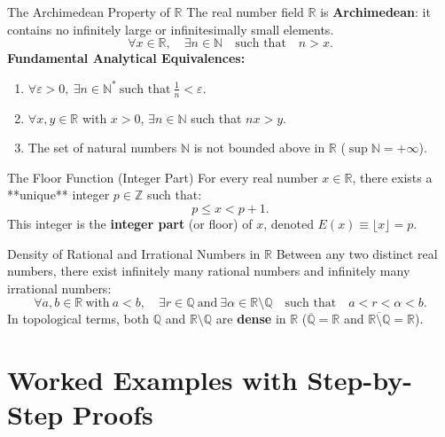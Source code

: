 \begin{theorembox}{The Archimedean Property of $\mathbb{R}$}
The real number field $\mathbb{R}$ is \textbf{Archimedean}: it contains no infinitely large or infinitesimally small elements.
\begin{equation}
\forall x \in \mathbb{R}, \quad \exists n \in \mathbb{N} \quad \text{such that} \quad n > x.
\end{equation}
\textbf{Fundamental Analytical Equivalences:}
\begin{enumerate}[leftmargin=1.4em,itemsep=2pt]
  \item $\forall \varepsilon > 0, \ \exists n \in \mathbb{N}^* \ \text{such that} \ \frac{1}{n} < \varepsilon$.
  \item $\forall x, y \in \mathbb{R}$ with $x > 0$, $\exists n \in \mathbb{N}$ such that $n x > y$.
  \item The set of natural numbers $\mathbb{N}$ is not bounded above in $\mathbb{R}$ ($\sup \mathbb{N} = +\infty$).
\end{enumerate}
\end{theorembox}

\begin{propbox}{The Floor Function (Integer Part)}
For every real number $x \in \mathbb{R}$, there exists a **unique** integer $p \in \mathbb{Z}$ such that:
\begin{equation}
p \le x < p + 1.
\end{equation}
This integer is the \textbf{integer part} (or floor) of $x$, denoted $E(x) \equiv \lfloor x \rfloor = p$.
\end{propbox}

\begin{theorembox}{Density of Rational and Irrational Numbers in $\mathbb{R}$}
Between any two distinct real numbers, there exist infinitely many rational numbers and infinitely many irrational numbers:
\begin{equation}
\forall a, b \in \mathbb{R} \ \text{with} \ a < b, \quad \exists r \in \mathbb{Q} \ \text{and} \ \exists \alpha \in \mathbb{R} \setminus \mathbb{Q} \quad \text{such that} \quad a < r < \alpha < b.
\end{equation}
In topological terms, both $\mathbb{Q}$ and $\mathbb{R} \setminus \mathbb{Q}$ are \textbf{dense} in $\mathbb{R}$ ($\overline{\mathbb{Q}} = \mathbb{R}$ and $\overline{\mathbb{R} \setminus \mathbb{Q}} = \mathbb{R}$).
\end{theorembox}

\section{Worked Examples with Step-by-Step Proofs}

